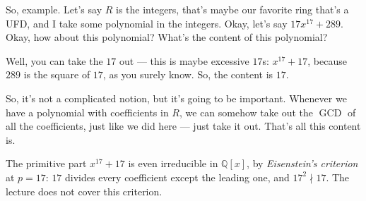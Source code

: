\begin{speech}[00:06:10 - 00:07:13]
So, example. Let's say $R$ is the integers, that's maybe our favorite ring that's a UFD, and I take some polynomial in the integers. Okay, let's say $17x^{17} + 289$.  Okay, how about this polynomial? What's the content of this polynomial?

Well, you can take the $17$ out --- this is maybe excessive $17$s: $x^{17} + 17$, because $289$ is the square of $17$, as you surely know.  So, the content is $17$. 

So, it's not a complicated notion, but it's going to be important. Whenever we have a polynomial with coefficients in $R$, we can somehow take out the $\operatorname{GCD}$ of all the coefficients, just like we did here --- just take it out. That's all this content is.
\end{speech}

\begin{content}
\end{content}

\begin{aiNote}
The primitive part $x^{17} + 17$ is even irreducible in $\mathbb{Q}[x]$, by \emph{Eisenstein's criterion} at $p = 17$: $17$ divides every coefficient except the leading one, and $17^2 \nmid 17$. The lecture does not cover this criterion.
\end{aiNote}

\begin{hidden}
\end{hidden}

